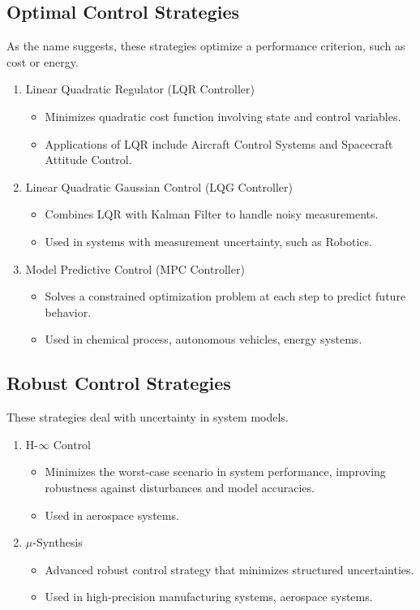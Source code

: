 \documentclass{article}
\begin{document}
\subsection{Optimal Control Strategies}
As the name suggests, these strategies optimize a performance criterion, such as cost or energy.
\begin{enumerate}
    \item Linear Quadratic Regulator (LQR Controller)
        \begin{itemize}
            \item Minimizes quadratic cost function involving state and control variables.
            \item Applications of LQR include Aircraft Control Systems and Spacecraft Attitude Control.
        \end{itemize}
    \item Linear Quadratic Gaussian Control (LQG Controller)
        \begin{itemize}
            \item Combines LQR with Kalman Filter to handle noisy measurements.
            \item Used in systems with measurement uncertainty, such as Robotics.
        \end{itemize}
    \item Model Predictive Control (MPC Controller)
        \begin{itemize}
            \item Solves a constrained optimization problem at each step to predict future behavior.
            \item Used in chemical process, autonomous vehicles, energy systems.
        \end{itemize}
\end{enumerate}

\subsection{Robust Control Strategies}
These strategies deal with uncertainty in system models.
\begin{enumerate}
    \item H-$\infty$ Control
        \begin{itemize}
            \item Minimizes the worst-case scenario in system performance, improving robustness against disturbances and model accuracies.
            \item Used in aerospace systems.
        \end{itemize}
    \item $\mu$-Synthesis
        \begin{itemize}
            \item Advanced robust control strategy that minimizes structured uncertainties.
            \item Used in high-precision manufacturing systems, aerospace systems.
        \end{itemize}
\end{enumerate}
\end{document}
